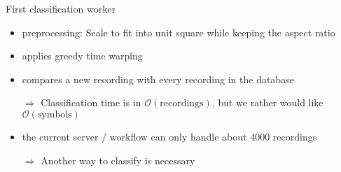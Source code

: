\begin{frame}{First classification worker}
    \begin{itemize}
        \item preprocessing: Scale to fit into unit square while keeping the aspect
              ratio
        \item applies greedy time warping
        \item compares a new recording with every recording
              in the database
        \item[$\Rightarrow$] Classification time is in $\mathcal{O}(\text{recordings})$,
              but we rather would like $\mathcal{O}(\text{symbols})$
        \item the current server / workflow can only handle about 4000 recordings
        \item[$\Rightarrow$] Another way to classify is necessary
    \end{itemize}
\end{frame}
